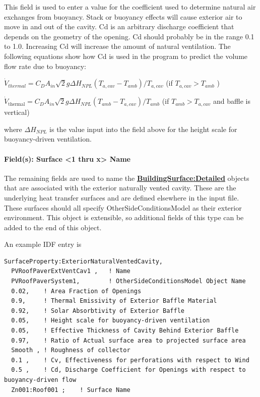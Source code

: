 This field is used to enter a value for the coefficient used to determine natural air exchanges from buoyancy. Stack or buoyancy effects will cause exterior air to move in and out of the cavity. Cd is an arbitrary discharge coefficient that depends on the geometry of the opening. Cd should probably be in the range 0.1 to 1.0. Increasing Cd will increase the amount of natural ventilation. The following equations show how Cd is used in the program to predict the volume flow rate due to buoyancy:

\(\dot{V}_{thermal} = C_D A_{in} \sqrt 2 g \Delta H_{NPL} \left( T_{a,cav} - T_{amb} \right) / T_{a,cav}\) (if \(T_{a,cav} > T_{amb}\) )

\(\dot{V}_{\text{thermal}} = C_D A_{in} \sqrt 2 g \Delta H_{NPL} \left( T_{amb} - T_{a,cav} \right) / T_{amb}\) (if \(T_{amb} > T_{a,cav}\) and baffle is vertical)

where \(\Delta {H_{NPL}}\) is the value input into the field above for the height scale for buoyancy-driven ventilation.

\paragraph{Field(s): Surface \textless{}1 thru x\textgreater{} Name}\label{fields-surface-1-thru-x-name}

The remaining fields are used to name the \textbf{\hyperref[buildingsurfacedetailed]{BuildingSurface:Detailed}} objects that are associated with the exterior naturally vented cavity. These are the underlying heat transfer surfaces and are defined elsewhere in the input file. These surfaces should all specify OtherSideConditionsModel as their exterior environment. This object is extensible, so additional fields of this type can be added to the end of this object.

An example IDF entry is

\begin{lstlisting}
SurfaceProperty:ExteriorNaturalVentedCavity,
  PVRoofPaverExtVentCav1 ,   ! Name
  PVRoofPaverSystem1,        ! OtherSideConditionsModel Object Name
  0.02,    ! Area Fraction of Openings
  0.9,     ! Thermal Emissivity of Exterior Baffle Material
  0.92,    ! Solar Absorbtivity of Exterior Baffle
  0.05,    ! Height scale for buoyancy-driven ventilation
  0.05,    ! Effective Thickness of Cavity Behind Exterior Baffle
  0.97,    ! Ratio of Actual surface area to projected surface area
  Smooth , ! Roughness of collector
  0.1 ,    ! Cv, Effectiveness for perforations with respect to Wind
  0.5 ,    ! Cd, Discharge Coefficient for Openings with respect to buoyancy-driven flow
  Zn001:Roof001 ;    ! Surface Name
\end{lstlisting}

